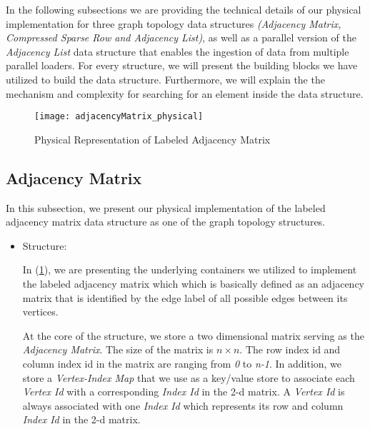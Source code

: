 {In the following subsections we are providing the technical details of our physical implementation for three graph topology data structures \textit{(Adjacency Matrix, Compressed Sparse Row and Adjacency List)}, as well as a parallel version of the \textit{Adjacency List} data structure that enables the ingestion of data from multiple parallel loaders. For every structure, we will present the building blocks we have utilized to build the data structure. Furthermore, we will explain the the mechanism and complexity for searching for an element inside the data structure.





\begin{figure}
\centering
\texttt{[image: adjacencyMatrix\_physical]}
\caption{Physical Representation of Labeled Adjacency Matrix}
\label{fig_adjacencyMatrix_physical}
\end{figure} 

\subsection{Adjacency Matrix}

In this subsection, we present our physical implementation of the labeled adjacency matrix data structure as one of the graph topology structures.

\begin{itemize}

\item{Structure:}

In (\ref{fig_adjacencyMatrix_physical}), we are presenting the underlying containers we utilized to implement the labeled adjacency matrix which which is basically defined as an adjacency matrix that is identified by the edge label of all possible edges between its vertices.

At the core of the structure, we store a two dimensional matrix serving as the \textit{Adjacency Matrix}. The size of the matrix is \textit{$n \times n$}. The row index id and column index id in the matrix are ranging from \textit{0} to \textit{n-1}. In addition, we store a \textit{Vertex-Index Map} that we use as a key/value store to associate each \textit{Vertex Id} with a corresponding \textit{Index Id} in the 2-d matrix. A \textit{Vertex Id} is always associated with one \textit{Index Id} which represents its row and column \textit{Index Id} in the 2-d matrix.


\end{itemize}}
